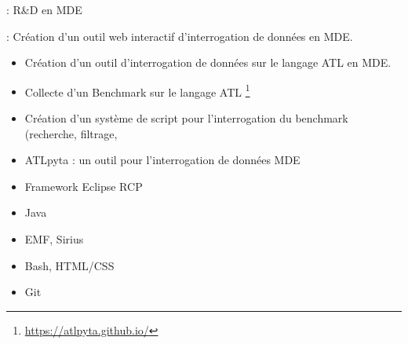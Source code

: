 
 : R\&D en MDE

 : Création d’un outil web interactif d’interrogation de données en MDE.

\bigskip


\begin{itemize}
\item Création d’un outil d’interrogation de données sur le langage ATL en MDE.
\end{itemize} 


\begin{itemize}
\item Collecte d’un Benchmark sur le langage ATL \footnote{\url{https://atlpyta.github.io/}}
\item Création d’un système de script pour l’interrogation du benchmark (recherche, filtrage, 
\item ATLpyta : un outil pour l'interrogation de données MDE
\end{itemize} 


\begin{itemize}
\item Framework Eclipse RCP
\item Java
\item EMF, Sirius
\item Bash, HTML/CSS
\item Git
\end{itemize} 
